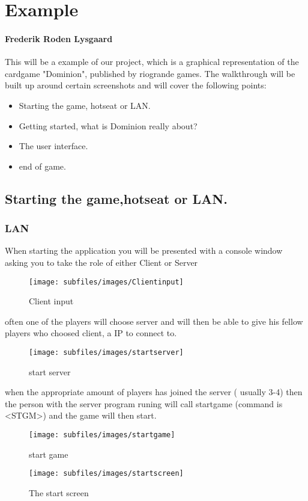 \section{Example}
\label{sec:Examp}
\paragraph{Frederik Roden Lysgaard}
This will be a example of our project, which is a graphical representation of the cardgame "Dominion", published by riogrande games.
The walkthrough will be built up around certain screenshots and will cover the following points:

\begin{itemize}
\item Starting the game, hotseat or LAN.
\item Getting started, what is Dominion really about?
\item The user interface.
\item end of game.
\end{itemize}

\subsection{Starting the game,hotseat or LAN.}
\subsubsection{LAN}
When starting the application you will be presented with a console window asking you to take the role of either Client or Server

\begin{figure}[h!]
\centering
\texttt{[image: subfiles/images/Clientinput]}
\caption{Client input}
\end{figure}

often one of the players will choose server and will then be able to give his fellow players who choosed client, a IP to connect to.
\begin{figure}[h!]
\centering
\texttt{[image: subfiles/images/startserver]}
\caption{start server}
\end{figure}
when the appropriate amount of players has joined the server ( usually 3-4) then the person with the server program runing will
call startgame (command is \textless STGM\textgreater ) and the game will then start.
\begin{figure}[h!]
\centering
\texttt{[image: subfiles/images/startgame]}
\caption{start game}
\end{figure}
\begin{figure}[h!]
\centering
\texttt{[image: subfiles/images/startscreen]}
\caption{The start screen}
\end{figure}
